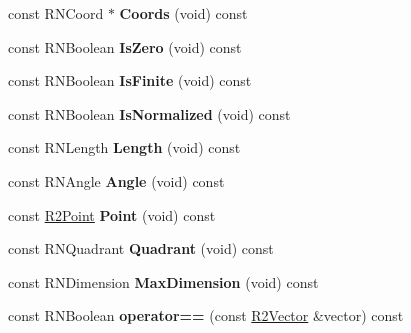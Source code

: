 \begin{DoxyCompactItemize}
\item 
const R\+N\+Coord $\ast$ {\bfseries Coords} (void) const \hypertarget{class_r2_vector_a95adba8bc76bc32e8a4be12967f2559a}{}\label{class_r2_vector_a95adba8bc76bc32e8a4be12967f2559a}

\item 
const R\+N\+Boolean {\bfseries Is\+Zero} (void) const \hypertarget{class_r2_vector_a52b9331e43fc57454e1af1fe09f3eae3}{}\label{class_r2_vector_a52b9331e43fc57454e1af1fe09f3eae3}

\item 
const R\+N\+Boolean {\bfseries Is\+Finite} (void) const \hypertarget{class_r2_vector_a7c908472b6ff6ce1fbd9e137ec1b51b7}{}\label{class_r2_vector_a7c908472b6ff6ce1fbd9e137ec1b51b7}

\item 
const R\+N\+Boolean {\bfseries Is\+Normalized} (void) const \hypertarget{class_r2_vector_aa108f7e49e841253e56f2d4486901f02}{}\label{class_r2_vector_aa108f7e49e841253e56f2d4486901f02}

\item 
const R\+N\+Length {\bfseries Length} (void) const \hypertarget{class_r2_vector_a05671fd6152d4a865cdd20b61741aea0}{}\label{class_r2_vector_a05671fd6152d4a865cdd20b61741aea0}

\item 
const R\+N\+Angle {\bfseries Angle} (void) const \hypertarget{class_r2_vector_a49470f895c29b35963198afb72f90198}{}\label{class_r2_vector_a49470f895c29b35963198afb72f90198}

\item 
const \hyperlink{class_r2_point}{R2\+Point} {\bfseries Point} (void) const \hypertarget{class_r2_vector_a0f8faba6a5f968d4535091c3bf46c0bf}{}\label{class_r2_vector_a0f8faba6a5f968d4535091c3bf46c0bf}

\item 
const R\+N\+Quadrant {\bfseries Quadrant} (void) const \hypertarget{class_r2_vector_a7a8291cc042cd77290452db3d5359d45}{}\label{class_r2_vector_a7a8291cc042cd77290452db3d5359d45}

\item 
const R\+N\+Dimension {\bfseries Max\+Dimension} (void) const \hypertarget{class_r2_vector_a7910e7c22089e9df746d6ad9ebfb1340}{}\label{class_r2_vector_a7910e7c22089e9df746d6ad9ebfb1340}

\item 
const R\+N\+Boolean {\bfseries operator==} (const \hyperlink{class_r2_vector}{R2\+Vector} \&vector) const \hypertarget{class_r2_vector_af29622d25f41ce999766016ec01eba83}{}\label{class_r2_vector_af29622d25f41ce999766016ec01eba83}


\end{DoxyCompactItemize}

